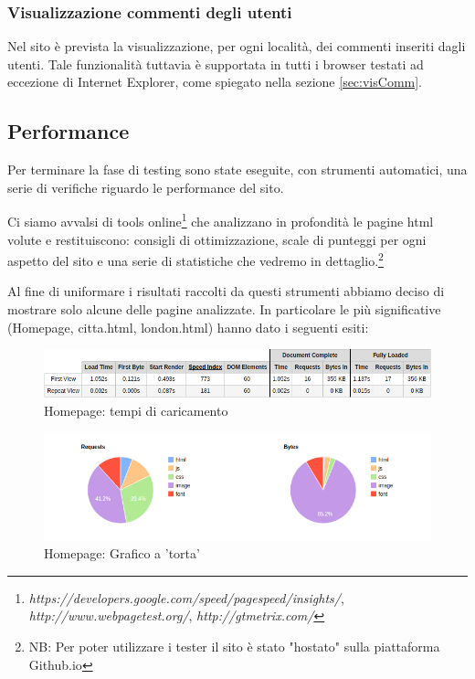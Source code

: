 \subsubsection{Visualizzazione commenti degli utenti}
Nel sito è prevista la visualizzazione, per ogni località, dei commenti inseriti dagli utenti.
Tale funzionalità tuttavia è supportata in tutti i browser testati ad eccezione di Internet Explorer, come spiegato nella sezione \ref{sec:visComm}.

\subsection{Performance}
Per terminare la fase di testing sono state eseguite, con strumenti automatici, una serie di verifiche riguardo le performance del sito.


\begin{flushleft}
Ci siamo avvalsi di tools online\footnote{ \textit{https://developers.google.com/speed/pagespeed/insights/}, \textit{http://www.webpagetest.org/}, \textit{http://gtmetrix.com/}} che analizzano in profondità le pagine html volute e restituiscono: consigli di ottimizzazione, scale di punteggi per ogni aspetto del sito e una serie di statistiche che vedremo in dettaglio.\footnote{ NB: Per poter utilizzare i tester il sito è stato "hostato" sulla piattaforma Github.io}
\end{flushleft}

\begin{flushleft}
Al fine di uniformare i risultati raccolti da questi strumenti abbiamo deciso di mostrare solo alcune delle pagine analizzate.
In particolare le più significative (Homepage, citta.html, london.html) hanno dato i seguenti esiti:
\end{flushleft}

\begin{figure}[h]

\includegraphics[width=\linewidth]{images/performance/webpagetest/home.png}
\caption{Homepage: tempi di caricamento}
\end{figure}
\begin{figure}[h]

\includegraphics[width=\linewidth]{images/performance/webpagetest/home-graph.png}
\caption{Homepage: Grafico a 'torta'}
\end{figure}

